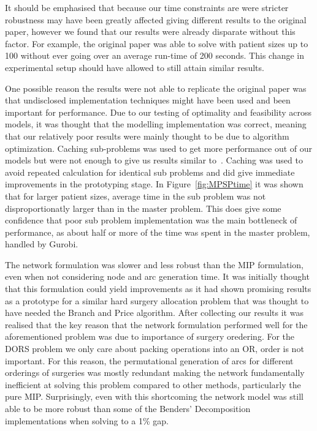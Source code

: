 It should be emphasised that because our time constraints are were stricter robustness may have been greatly affected giving different results to the original paper, however we found that our results were already disparate without this factor. For example, the original paper was able to solve with patient sizes up to 100 without ever going over an average run-time of 200 seconds. This change in experimental setup should have allowed to still attain similar results.

One possible reason the results were not able to replicate the original paper was that undisclosed implementation techniques might have been used and been important for performance. Due to our testing of optimality and feasibility across models, it was thought that the modelling implementation was correct, meaning that our relatively poor results were mainly thought to be due to algorithm optimization. Caching sub-problems was used to get more performance out of our models but were not enough to give us results similar to~\cite{roshanaei2017propagating}. Caching was used to avoid repeated calculation for identical sub problems and did give immediate improvements in the prototyping stage. In Figure~\ref{fig:MPSPtime} it was shown that for larger patient sizes, average time in the sub problem was not disproportionatly larger than in the master problem. This does give some confidence that poor sub problem implementation was the main bottleneck of performance, as about half or more of the time was spent in the master problem, handled by Gurobi. 

The network formulation was slower and less robust than the MIP formulation, even when not considering node and arc generation time. It was initially thought that this formulation could yield improvements as it had shown promising results as a prototype for a similar hard surgery allocation problem that was thought to have needed the Branch and Price algorithm\cite{DoulabiBranchPriceOR}. After collecting our results it was realised that the key reason that the network formulation performed well for the aforementioned problem was due to importance of surgery oredering. For the DORS problem we only care about packing operations into an OR, order is not important. For this reason, the permutational generation of arcs for different orderings of surgeries was mostly redundant making the network fundamentally inefficient at solving this problem compared to other methods, particularly the pure MIP. Surprisingly, even with this shortcoming the network model was still able to be more robust than some of the Benders' Decomposition implementations when solving to a 1\% gap.

